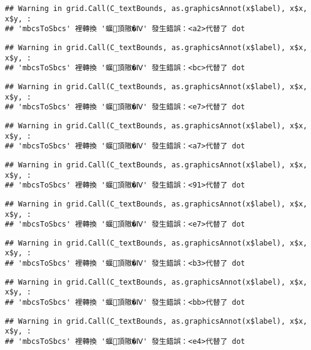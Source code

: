 \documentclass[
]{article}
\begin{document}
\begin{verbatim}
## Warning in grid.Call(C_textBounds, as.graphicsAnnot(x$label), x$x, x$y, :
## 'mbcsToSbcs' 裡轉換 '蝘頂隞�Ⅳ' 發生錯誤：<a2>代替了 dot
\end{verbatim}

\begin{verbatim}
## Warning in grid.Call(C_textBounds, as.graphicsAnnot(x$label), x$x, x$y, :
## 'mbcsToSbcs' 裡轉換 '蝘頂隞�Ⅳ' 發生錯誤：<bc>代替了 dot
\end{verbatim}

\begin{verbatim}
## Warning in grid.Call(C_textBounds, as.graphicsAnnot(x$label), x$x, x$y, :
## 'mbcsToSbcs' 裡轉換 '蝘頂隞�Ⅳ' 發生錯誤：<e7>代替了 dot
\end{verbatim}

\begin{verbatim}
## Warning in grid.Call(C_textBounds, as.graphicsAnnot(x$label), x$x, x$y, :
## 'mbcsToSbcs' 裡轉換 '蝘頂隞�Ⅳ' 發生錯誤：<a7>代替了 dot
\end{verbatim}

\begin{verbatim}
## Warning in grid.Call(C_textBounds, as.graphicsAnnot(x$label), x$x, x$y, :
## 'mbcsToSbcs' 裡轉換 '蝘頂隞�Ⅳ' 發生錯誤：<91>代替了 dot
\end{verbatim}

\begin{verbatim}
## Warning in grid.Call(C_textBounds, as.graphicsAnnot(x$label), x$x, x$y, :
## 'mbcsToSbcs' 裡轉換 '蝘頂隞�Ⅳ' 發生錯誤：<e7>代替了 dot
\end{verbatim}

\begin{verbatim}
## Warning in grid.Call(C_textBounds, as.graphicsAnnot(x$label), x$x, x$y, :
## 'mbcsToSbcs' 裡轉換 '蝘頂隞�Ⅳ' 發生錯誤：<b3>代替了 dot
\end{verbatim}

\begin{verbatim}
## Warning in grid.Call(C_textBounds, as.graphicsAnnot(x$label), x$x, x$y, :
## 'mbcsToSbcs' 裡轉換 '蝘頂隞�Ⅳ' 發生錯誤：<bb>代替了 dot
\end{verbatim}

\begin{verbatim}
## Warning in grid.Call(C_textBounds, as.graphicsAnnot(x$label), x$x, x$y, :
## 'mbcsToSbcs' 裡轉換 '蝘頂隞�Ⅳ' 發生錯誤：<e4>代替了 dot
\end{verbatim}
\end{document}
